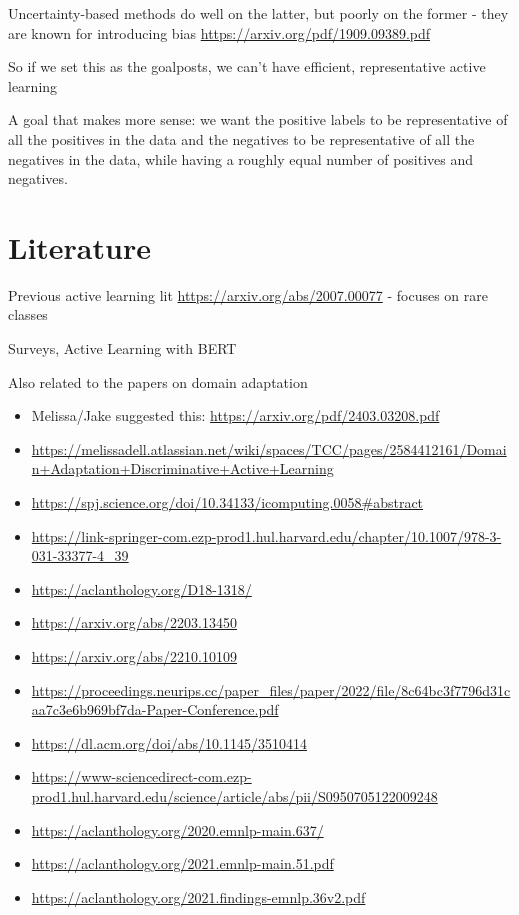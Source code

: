 \documentclass[11pt]{article}
\begin{document}
Uncertainty-based methods do well on the latter, but poorly on the former - they are known for introducing bias \url{https://arxiv.org/pdf/1909.09389.pdf}



So if we set this as the goalposts, we can’t have efficient, representative active learning 

A goal that makes more sense: we want the positive labels to be representative of all the positives in the data and the negatives to be representative of all the negatives in the data, while having a roughly equal number of positives and negatives. 



\section{Literature}

Previous active learning lit
\url{https://arxiv.org/abs/2007.00077} - focuses on rare classes

Surveys, Active Learning with BERT 

Also related to the papers on domain adaptation 

\begin{itemize} 
\item Melissa/Jake suggested this: \url{https://arxiv.org/pdf/2403.03208.pdf}
\item \url{https://melissadell.atlassian.net/wiki/spaces/TCC/pages/2584412161/Domain+Adaptation+Discriminative+Active+Learning}
\item \url{https://spj.science.org/doi/10.34133/icomputing.0058#abstract}
\item \url{https://link-springer-com.ezp-prod1.hul.harvard.edu/chapter/10.1007/978-3-031-33377-4_39}
\item \url{https://aclanthology.org/D18-1318/}
\item \url{https://arxiv.org/abs/2203.13450}
\item \url{https://arxiv.org/abs/2210.10109}
\item \url{https://proceedings.neurips.cc/paper_files/paper/2022/file/8c64bc3f7796d31caa7c3e6b969bf7da-Paper-Conference.pdf}
\item \url{https://dl.acm.org/doi/abs/10.1145/3510414}
\item \url{https://www-sciencedirect-com.ezp-prod1.hul.harvard.edu/science/article/abs/pii/S0950705122009248}
\item \url{https://aclanthology.org/2020.emnlp-main.637/}
\item \url{https://aclanthology.org/2021.emnlp-main.51.pdf}
\item \url{https://aclanthology.org/2021.findings-emnlp.36v2.pdf}
\end{itemize}
\end{document}
